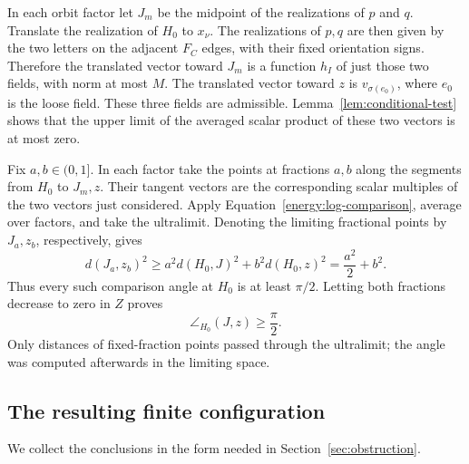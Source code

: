 In each orbit factor let $J_m$ be the midpoint of the realizations
of $p$ and $q$.  Translate the realization of $H_0$ to $x_\nu$.
The realizations of $p,q$ are then given by the two letters on the
adjacent $F_C$ edges, with their fixed orientation signs.  Therefore
the translated vector toward $J_m$ is a function $h_I$ of just
those two fields, with norm at most $M$.  The translated vector
toward $z$ is $v_{\sigma(e_0)}$, where $e_0$ is the loose field.
These three fields are admissible.  Lemma~\ref{lem:conditional-test}
shows that the upper limit of the averaged scalar product of these
two vectors is at most zero.

Fix $a,b\in(0,1]$.  In each factor take the points at fractions
$a,b$ along the segments from $H_0$ to $J_m,z$.  Their tangent
vectors are the corresponding scalar multiples of the two vectors
just considered.  Apply Equation~\eqref{energy:log-comparison},
average over factors, and take the ultralimit.  Denoting the
limiting fractional points by $J_a,z_b$, respectively, gives
\begin{equation}\label{energy:fractional-angle}
 d(J_a,z_b)^2\ge
 a^2d(H_0,J)^2+b^2d(H_0,z)^2
 =\frac{a^2}{2}+b^2.
\end{equation}
Thus every such comparison angle at $H_0$ is at least $\pi/2$.
Letting both fractions decrease to zero in $Z$ proves
\begin{equation}\label{energy:ternary-angle}
 \angle_{H_0}(J,z)\ge\frac\pi2.
\end{equation}
Only distances of fixed-fraction points passed through the
ultralimit; the angle was computed afterwards in the limiting
space.

\subsection{The resulting finite configuration}

We collect the conclusions in the form needed in
Section~\ref{sec:obstruction}.

